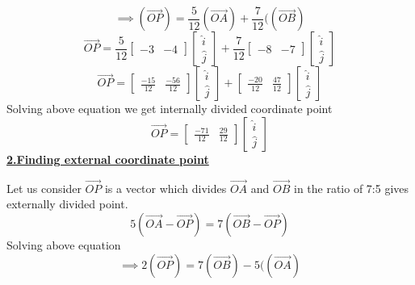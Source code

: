 \documentclass[journal,12pt,twocolumn]{IEEEtran}
\begin{document}
\begin{equation}
\implies(\overrightarrow{OP})=
\frac{5}{12}
(\overrightarrow{OA})+\frac{7}{12}((\overrightarrow{OB})
\end{equation}
\begin{equation}
\overrightarrow{OP}=
\frac{5}{12}
 \begin{bmatrix}
 -3 & -4 
 \end{bmatrix}
 \begin{bmatrix}
 \hat{i}\\
 \hat{j}
 \end{bmatrix}
+\frac{7}{12}
\begin{bmatrix}
-8 & -7 
\end{bmatrix}
 \begin{bmatrix}
\hat{i}\\
\hat{j}
 \end{bmatrix}
\end{equation}
\begin{equation}
\overrightarrow{OP}=
\begin{bmatrix}
\frac{-15}{12}&\frac{-56}{12}
 \end{bmatrix}
 \begin{bmatrix}
 \hat{i}\\
 \hat{j}
 \end{bmatrix}
+
 \begin{bmatrix}
\frac{-20}{12} & \frac{47}{12} 
 \end{bmatrix}
 \begin{bmatrix}
 \hat{i}\\
 \hat{j}
 \end{bmatrix}
\end{equation}
 Solving above equation we get internally divided coordinate point
\begin{equation}
 \overrightarrow{OP}=
\begin{bmatrix}
\frac{-71}{12}  &  \frac{29}{12}
\end{bmatrix}
 \begin{bmatrix}
 \hat{i}\\
 \hat{j}
 \end{bmatrix}
\end{equation}
{\underline{\bf 2.Finding external coordinate point}}

Let us consider
$\overrightarrow{OP}$ is a vector which divides $\overrightarrow{OA}$ and $\overrightarrow{OB}$ in the ratio of 7:5 gives externally divided point.
\begin{equation}
5(\overrightarrow{OA}-\overrightarrow{OP})=7(\overrightarrow{OB}-\overrightarrow{OP})
\end{equation}
Solving above equation
\begin{equation}
\implies 2(\overrightarrow{OP})=7(\overrightarrow{OB})-5((\overrightarrow{OA})
\end{equation}
\end{document}
